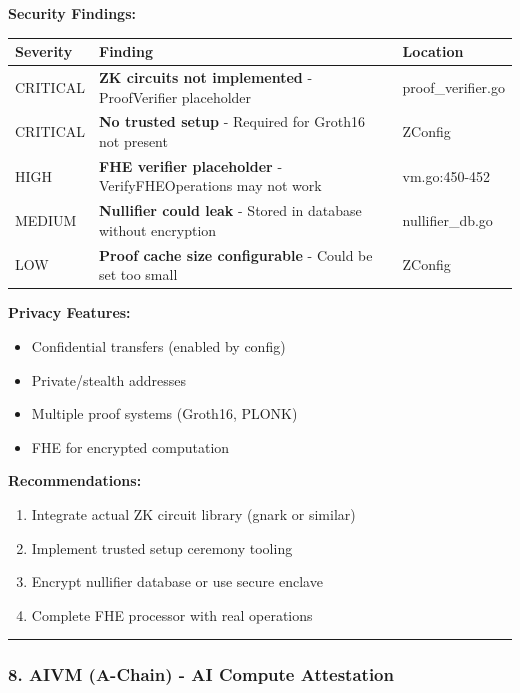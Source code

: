 \documentclass[
]{article}
\newcounter{none} %
\providecommand{\tightlist}{%
  \setlength{\itemsep}{0pt}\setlength{\parskip}{0pt}}
\begin{document}
\textbf{Security Findings:}

{\def\LTcaptype{none} %
\begin{longtable}[]{@{}lll@{}}
\toprule\noalign{}
Severity & Finding & Location \\
\midrule\noalign{}
\endhead
\bottomrule\noalign{}
\endlastfoot
CRITICAL & \textbf{ZK circuits not implemented} - ProofVerifier
placeholder & proof\_verifier.go \\
CRITICAL & \textbf{No trusted setup} - Required for Groth16 not present
& ZConfig \\
HIGH & \textbf{FHE verifier placeholder} - VerifyFHEOperations may not
work & vm.go:450-452 \\
MEDIUM & \textbf{Nullifier could leak} - Stored in database without
encryption & nullifier\_db.go \\
LOW & \textbf{Proof cache size configurable} - Could be set too small &
ZConfig \\
\end{longtable}
}

\textbf{Privacy Features:}

\begin{itemize}
\tightlist
\item
  Confidential transfers (enabled by config)
\item
  Private/stealth addresses
\item
  Multiple proof systems (Groth16, PLONK)
\item
  FHE for encrypted computation
\end{itemize}

\textbf{Recommendations:}

\begin{enumerate}
\def\labelenumi{\arabic{enumi}.}
\tightlist
\item
  Integrate actual ZK circuit library (gnark or similar)
\item
  Implement trusted setup ceremony tooling
\item
  Encrypt nullifier database or use secure enclave
\item
  Complete FHE processor with real operations
\end{enumerate}

\begin{center}\rule{0.5\linewidth}{0.5pt}\end{center}

\subsubsection{8. AIVM (A-Chain) - AI Compute
Attestation}\label{8-aivm-a-chain---ai-compute-attestation}
\end{document}
